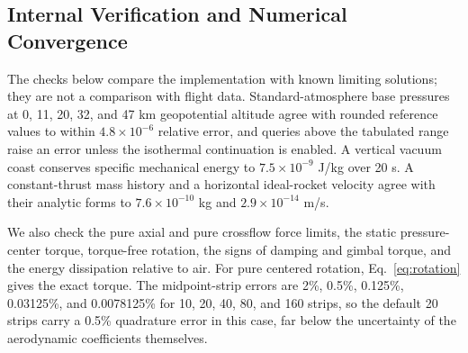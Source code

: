 \subsection{Internal Verification and Numerical Convergence}
The checks below compare the implementation with known limiting solutions; they are not a comparison with flight data. Standard-atmosphere base pressures at 0, 11, 20, 32, and 47 km geopotential altitude agree with rounded reference values to within $4.8\times10^{-6}$ relative error, and queries above the tabulated range raise an error unless the isothermal continuation is enabled. A vertical vacuum coast conserves specific mechanical energy to $7.5\times10^{-9}$ J/kg over 20 s. A constant-thrust mass history and a horizontal ideal-rocket velocity agree with their analytic forms to $7.6\times10^{-10}$ kg and $2.9\times10^{-14}$ m/s.

We also check the pure axial and pure crossflow force limits, the static pressure-center torque, torque-free rotation, the signs of damping and gimbal torque, and the energy dissipation relative to air. For pure centered rotation, Eq.~\eqref{eq:rotation} gives the exact torque. The midpoint-strip errors are 2\%, 0.5\%, 0.125\%, 0.03125\%, and 0.0078125\% for 10, 20, 40, 80, and 160 strips, so the default 20 strips carry a 0.5\% quadrature error in this case, far below the uncertainty of the aerodynamic coefficients themselves.


